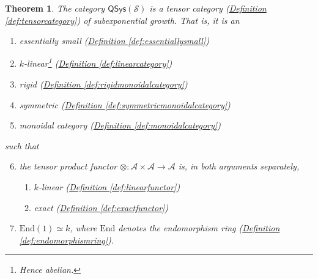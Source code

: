\documentclass[a4paper,10pt]{scrreprt}
\theoremstyle{definition}
\theoremstyle{plain}
\newtheorem{theorem}{Theorem}[section]
\theoremstyle{remark}
\begin{document}
\begin{theorem}
  The category $\mathsf{QSys}(\mathcal{S})$ is a tensor category (\hyperref[def:tensorcategory]{Definition \ref*{def:tensorcategory}}) of subexponential growth. That is, it is an
  \begin{enumerate}
    \item essentially small (\hyperref[def:essentiallysmall]{Definition \ref*{def:essentiallysmall}})

    \item $k$-linear\footnote{Hence abelian.} (\hyperref[def:linearcategory]{Definition \ref*{def:linearcategory}})

    \item rigid (\hyperref[def:rigidmonoidalcategory]{Definition \ref*{def:rigidmonoidalcategory}})

    \item symmetric (\hyperref[def:symmetricmonoidalcategory]{Definition \ref*{def:symmetricmonoidalcategory}})

    \item monoidal category (\hyperref[def:monoidalcategory]{Definition \ref*{def:monoidalcategory}})
  \end{enumerate}
  such that
  \begin{enumerate}
      \setcounter{enumi}{5}
    \item the tensor product functor $\otimes\colon \mathscr{A} \times \mathscr{A} \to \mathscr{A}$ is, in both arguments separately,
      \begin{enumerate}
        \item $k$-linear (\hyperref[def:linearfunctor]{Definition \ref*{def:linearfunctor}})

        \item exact (\hyperref[def:exactfunctor]{Definition \ref*{def:exactfunctor}})
      \end{enumerate}

    \item $\mathrm{End}(1) \simeq k$, where $\mathrm{End}$ denotes the endomorphism ring (\hyperref[def:endomorphismring]{Definition \ref*{def:endomorphismring}}).
  \end{enumerate}
\end{theorem}
\end{document}
